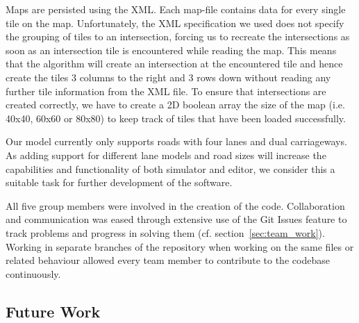 Maps are persisted using the XML. Each map-file contains data for every single tile on the map. Unfortunately, the XML specification we used does not specify the grouping of tiles to an intersection, forcing us to recreate the intersections as soon as an intersection tile is encountered while reading the map. This means that the algorithm will create an intersection at the encountered tile and hence create the tiles 3 columns to the right and 3 rows down without reading any further tile information from the XML file. To ensure that intersections are created correctly, we have to create a 2D boolean array the size of the map (i.e. 40x40, 60x60 or 80x80) to keep track of tiles that have been loaded successfully. 

Our model currently only supports roads with four lanes and dual carriageways. As adding support for different lane models and road sizes will increase the capabilities and functionality of both simulator and editor, we consider this a suitable task for further development of the software. 

All five group members were involved in the creation of the code. Collaboration and communication was eased through extensive use of the Git Issues feature to track problems and progress in solving them (cf. section~\ref{sec:team_work}). Working in separate branches of the repository when working on the same files or related behaviour allowed every team member to contribute to the codebase continuously.  

\subsection{Future Work}
